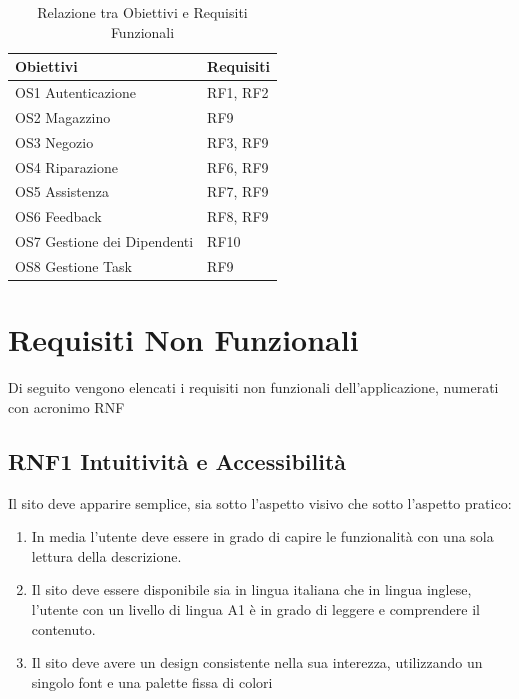 \documentclass{report}
\begin{document}
\begin{table}
\begin{center} %
	\centering
	\begin{tabular}{ |p{4cm}|p{4cm}|  }
		\hline
		\centering Obiettivi & \qquad\qquad Requisiti \\ %
		\hline
		OS1 Autenticazione & RF1, RF2 \\
		\hline
		OS2 Magazzino & RF9 \\
		\hline
		OS3 Negozio &
		RF3, RF9 \\
		\hline
		OS4 Riparazione & RF6, RF9\\
		\hline
		OS5 Assistenza & RF7, RF9 \\
		\hline
		OS6 Feedback & RF8, RF9 \\
		\hline
		OS7 Gestione dei Dipendenti & RF10 \\
		\hline
		OS8 Gestione Task & RF9 \\
		\hline
	\end{tabular}
\caption{Relazione tra Obiettivi e Requisiti Funzionali}
\end{center}
\end{table}


\section{Requisiti Non Funzionali}
Di seguito vengono elencati i requisiti non funzionali dell’applicazione, numerati con acronimo RNF

\subsection*{RNF1 Intuitività e Accessibilità}
Il sito deve apparire semplice, sia sotto l'aspetto visivo che sotto l'aspetto pratico:
\begin{enumerate}
	\item In media l’utente deve essere in grado di capire le funzionalità con una sola lettura della descrizione.
	\item Il sito deve essere disponibile sia in lingua italiana che in lingua inglese, l’utente con un livello di lingua A1 è in grado di leggere e comprendere il contenuto.
	\item Il sito deve avere un design consistente nella sua interezza, utilizzando un singolo font e una palette fissa di colori
\end{enumerate}
\end{document}
